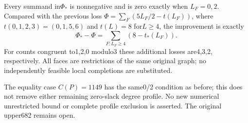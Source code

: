 \documentclass{article}
\begin{document}
Every summand in$\Phi_*$ is nonnegative and is zero exactly when
$L_F=0,2$. Compared with the previous loss
$\Phi=\sum_F(5L_F/2-t(L_F))$, where
$t(0,1,2,3)=(0,1,5,6)$ and $t(L)=8$ for$L\ge4$, the improvement
is exactly
\[
 \Phi_*-\Phi=\sum_{F:L_F\ge4}(8-t_*(L_F)).              \tag{3}
\]
For counts congruent to1,2,0 modulo3 these additional losses are4,3,2,
respectively. All faces are restrictions of the same original graph;
no independently feasible local completions are substituted.

The equality case $C(P)=1149$ has the same0/2 condition as before;
this does not remove either remaining zero-slack degree profile.
No new numerical unrestricted bound or complete profile exclusion
is asserted. The original upper682 remains open.
\end{document}

